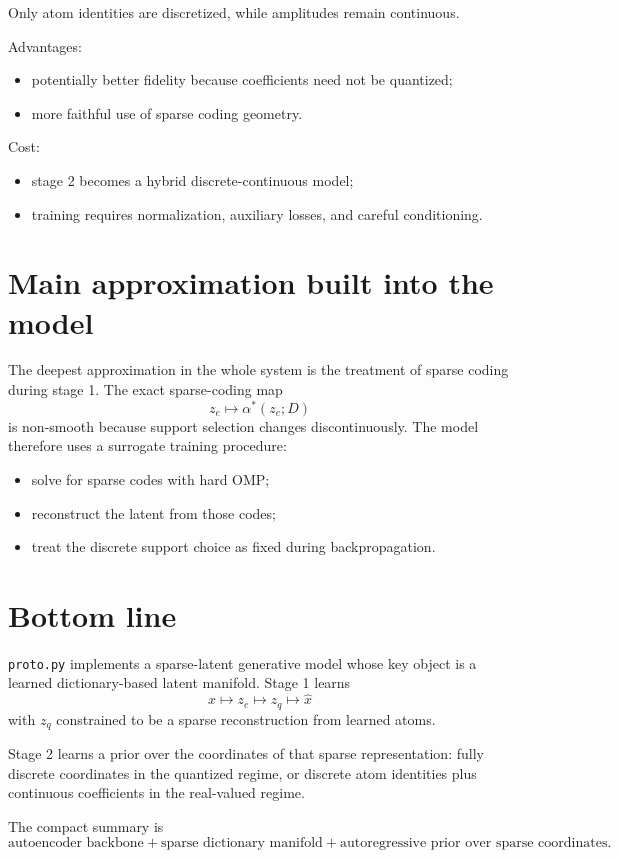 \documentclass[11pt]{article}
\begin{document}
Only atom identities are discretized, while amplitudes remain continuous.

Advantages:
\begin{itemize}
  \item potentially better fidelity because coefficients need not be quantized;
  \item more faithful use of sparse coding geometry.
\end{itemize}

Cost:
\begin{itemize}
  \item stage 2 becomes a hybrid discrete-continuous model;
  \item training requires normalization, auxiliary losses, and careful conditioning.
\end{itemize}

\section{Main approximation built into the model}

The deepest approximation in the whole system is the treatment of sparse coding during stage 1. The exact sparse-coding map
\[
z_e \mapsto \alpha^*(z_e; D)
\]
is non-smooth because support selection changes discontinuously. The model therefore uses a surrogate training procedure:
\begin{itemize}
  \item solve for sparse codes with hard OMP;
  \item reconstruct the latent from those codes;
  \item treat the discrete support choice as fixed during backpropagation.
\end{itemize}

\section{Bottom line}

\texttt{proto.py} implements a sparse-latent generative model whose key object is a learned dictionary-based latent manifold. Stage 1 learns
\[
x \mapsto z_e \mapsto z_q \mapsto \hat x
\]
with $z_q$ constrained to be a sparse reconstruction from learned atoms.

Stage 2 learns a prior over the coordinates of that sparse representation: fully discrete coordinates in the quantized regime, or discrete atom identities plus continuous coefficients in the real-valued regime.

The compact summary is
\[
\text{autoencoder backbone}
+
\text{sparse dictionary manifold}
+
\text{autoregressive prior over sparse coordinates}.
\]
\end{document}
